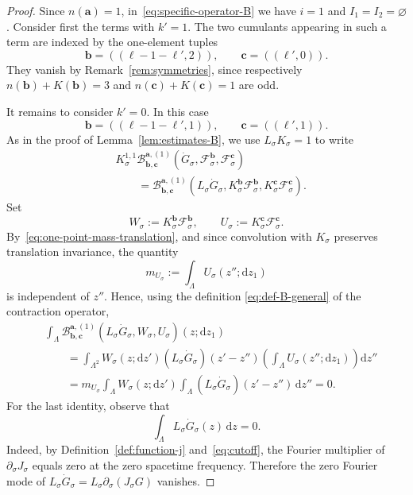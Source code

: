 \documentclass{article}
\numberwithin{equation}{section}
\newcommand{\assign}{:=}
\newcommand{\mathd}{\mathrm{d}}
\theoremstyle{plain}
\theoremstyle{definition}
\begin{document}
\begin{proof}
  Since $n(\boldsymbol a)=1$, in~\eqref{eq:specific-operator-B} we have
  $i=1$ and $I_1=I_2=\varnothing$. Consider first the terms with $k'=1$.
  The two cumulants appearing in such a term are indexed by the one-element
  tuples
  \[
    \boldsymbol b=((\ell-1-\ell',2)),
    \qquad
    \boldsymbol c=((\ell',0)).
  \]
  They vanish by Remark~\ref{rem:symmetries}, since respectively
  $n(\boldsymbol b)+K(\boldsymbol b)=3$ and
  $n(\boldsymbol c)+K(\boldsymbol c)=1$ are odd.

  It remains to consider $k'=0$. In this case
  \[
    \boldsymbol b=((\ell-1-\ell',1)),
    \qquad
    \boldsymbol c=((\ell',1)).
  \]
  As in the proof of Lemma~\ref{lem:estimates-B}, we use
  $L_\sigma K_\sigma=1$ to write
  \begin{align*}
    &K^{1,1}_\sigma
    \mathcal B^{\boldsymbol a,(1)}_{\boldsymbol b,\boldsymbol c}
    (\dot G_\sigma,
     \mathcal F^{\boldsymbol b}_\sigma,
     \mathcal F^{\boldsymbol c}_\sigma)
    \\
    &\qquad=
    \mathcal B^{\boldsymbol a,(1)}_{\boldsymbol b,\boldsymbol c}
    (L_\sigma\dot G_\sigma,
     K^{\boldsymbol b}_\sigma\mathcal F^{\boldsymbol b}_\sigma,
     K^{\boldsymbol c}_\sigma\mathcal F^{\boldsymbol c}_\sigma).
  \end{align*}
  Set
  \[
    W_\sigma\assign
    K^{\boldsymbol b}_\sigma\mathcal F^{\boldsymbol b}_\sigma,
    \qquad
    U_\sigma\assign
    K^{\boldsymbol c}_\sigma\mathcal F^{\boldsymbol c}_\sigma.
  \]
  By~\eqref{eq:one-point-mass-translation}, and since convolution with
  $K_\sigma$ preserves translation invariance, the quantity
  \[
    m_{U_\sigma}\assign
    \int_\Lambda U_\sigma(z'';\mathd z_1)
  \]
  is independent of $z''$. Hence, using the definition
  \eqref{eq:def-B-general} of the contraction operator,
  \begin{align*}
    &\int_\Lambda
    \mathcal B^{\boldsymbol a,(1)}_{\boldsymbol b,\boldsymbol c}
    (L_\sigma\dot G_\sigma,W_\sigma,U_\sigma)
    (z;\mathd z_1)
    \\
    &\qquad=
    \int_{\Lambda^2}
    W_\sigma(z;\mathd z')
    (L_\sigma\dot G_\sigma)(z'-z'')
    \left(\int_\Lambda U_\sigma(z'';\mathd z_1)\right)
    \mathd z''
    \\
    &\qquad=
    m_{U_\sigma}
    \int_\Lambda W_\sigma(z;\mathd z')
    \int_\Lambda (L_\sigma\dot G_\sigma)(z'-z'')\,\mathd z''
    =0.
  \end{align*}
  For the last identity, observe that
  \begin{equation}
    \int_\Lambda L_\sigma\dot G_\sigma(z)\,\mathd z=0.
    \label{eq:L-Gdot-zero-mass}
  \end{equation}
  Indeed, by Definition~\ref{def:function-j} and~\eqref{eq:cutoff}, the Fourier
  multiplier of $\partial_\sigma J_\sigma$ equals zero at the zero spacetime frequency.
  Therefore the zero Fourier mode of
  $L_\sigma\dot G_\sigma=L_\sigma\partial_\sigma(J_\sigma G)$ vanishes.


\end{proof}
\end{document}
